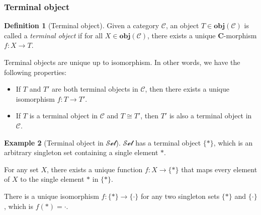 \documentclass[12pt,a4paper]{report}
\theoremstyle{definition}
\newtheorem{definition}{Definition}[chapter]
\newtheorem{example}[definition]{Example}
\begin{document}
            \subsubsection{Terminal object}
            \begin{definition}[Terminal object]
                Given a category $\mathcal{C}$, an object $T \in \textbf{obj}(\mathcal{C})$ is called a \emph{terminal object} if for all $X \in \textbf{obj}(\mathcal{C})$, there exists a unique \textbf{C}-morphism $f : X \to T$.
            \end{definition}
            Terminal objects are unique up to isomorphism. In other words, we have the following properties:
            \begin{itemize}
                \item 
                    If $T$ and $T'$ are both terminal objects in $\mathcal{C}$, then there exists a unique isomorphism $f : T \to T'$.
                \item
                    If $T$ is a terminal object in $\mathcal{C}$ and $T \cong T'$, then $T'$ is also a terminal object in $\mathcal{C}$.
            \end{itemize}
            \begin{example}[Terminal object in $\mathcal{Set}$]
                $\mathcal{Set}$ has a terminal object $\{\ast\}$, which is an arbitrary singleton set containing a single element $\ast$.

                For any set $X$, there exists a unique function $f : X \to \{\ast\}$ that maps every element of $X$ to the single element $\ast$ in $\{\ast\}$.
                
                There is a unique isomorphism $f : \{\ast\} \to \{\cdot\}$ for any two singleton sets $\{\ast\}$ and $\{\cdot\}$, which is $f(\ast) = \cdot$.
            \end{example}

            
\end{document}
